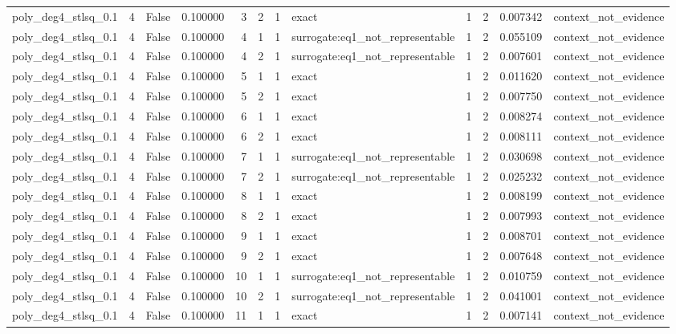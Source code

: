 \begin{tabular}{lrrrrrrlrrrl}
poly\_deg4\_stlsq\_0.1 & 4 & False & 0.100000 & 3 & 2 & 1 & exact & 1 & 2 & 0.007342 & context\_not\_evidence \\
poly\_deg4\_stlsq\_0.1 & 4 & False & 0.100000 & 4 & 1 & 1 & surrogate:eq1\_not\_representable & 1 & 2 & 0.055109 & context\_not\_evidence \\
poly\_deg4\_stlsq\_0.1 & 4 & False & 0.100000 & 4 & 2 & 1 & surrogate:eq1\_not\_representable & 1 & 2 & 0.007601 & context\_not\_evidence \\
poly\_deg4\_stlsq\_0.1 & 4 & False & 0.100000 & 5 & 1 & 1 & exact & 1 & 2 & 0.011620 & context\_not\_evidence \\
poly\_deg4\_stlsq\_0.1 & 4 & False & 0.100000 & 5 & 2 & 1 & exact & 1 & 2 & 0.007750 & context\_not\_evidence \\
poly\_deg4\_stlsq\_0.1 & 4 & False & 0.100000 & 6 & 1 & 1 & exact & 1 & 2 & 0.008274 & context\_not\_evidence \\
poly\_deg4\_stlsq\_0.1 & 4 & False & 0.100000 & 6 & 2 & 1 & exact & 1 & 2 & 0.008111 & context\_not\_evidence \\
poly\_deg4\_stlsq\_0.1 & 4 & False & 0.100000 & 7 & 1 & 1 & surrogate:eq1\_not\_representable & 1 & 2 & 0.030698 & context\_not\_evidence \\
poly\_deg4\_stlsq\_0.1 & 4 & False & 0.100000 & 7 & 2 & 1 & surrogate:eq1\_not\_representable & 1 & 2 & 0.025232 & context\_not\_evidence \\
poly\_deg4\_stlsq\_0.1 & 4 & False & 0.100000 & 8 & 1 & 1 & exact & 1 & 2 & 0.008199 & context\_not\_evidence \\
poly\_deg4\_stlsq\_0.1 & 4 & False & 0.100000 & 8 & 2 & 1 & exact & 1 & 2 & 0.007993 & context\_not\_evidence \\
poly\_deg4\_stlsq\_0.1 & 4 & False & 0.100000 & 9 & 1 & 1 & exact & 1 & 2 & 0.008701 & context\_not\_evidence \\
poly\_deg4\_stlsq\_0.1 & 4 & False & 0.100000 & 9 & 2 & 1 & exact & 1 & 2 & 0.007648 & context\_not\_evidence \\
poly\_deg4\_stlsq\_0.1 & 4 & False & 0.100000 & 10 & 1 & 1 & surrogate:eq1\_not\_representable & 1 & 2 & 0.010759 & context\_not\_evidence \\
poly\_deg4\_stlsq\_0.1 & 4 & False & 0.100000 & 10 & 2 & 1 & surrogate:eq1\_not\_representable & 1 & 2 & 0.041001 & context\_not\_evidence \\
poly\_deg4\_stlsq\_0.1 & 4 & False & 0.100000 & 11 & 1 & 1 & exact & 1 & 2 & 0.007141 & context\_not\_evidence \\

\end{tabular}

